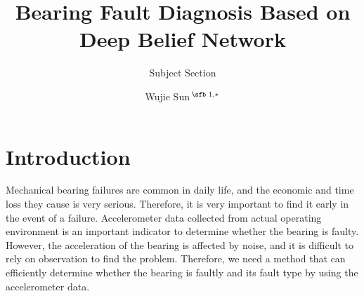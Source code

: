 \documentclass{modified}
\begin{document}

\subtitle{Subject Section}

\title[Bearing Fault Diagnosis Based on Deep Belief Network]{Bearing Fault Diagnosis Based on Deep Belief Network}
\author[Sun.]{Wujie Sun\,$^{\text{\sfb 1,}*}$}
\address{$^{\text{\sf 1}}$School of Software Engineering, South China University of Technology, Guangzhou 510006, P.R. China.}





\maketitle

\section{Introduction}
Mechanical bearing failures are common in daily life, and the economic and time loss they cause is very serious. Therefore, it is very important to find it early in the event of a failure. Accelerometer data collected from actual operating environment is an important indicator to determine whether the bearing is faulty. However, the acceleration of the bearing is affected by noise, and it is difficult to rely on observation to find the problem. Therefore, we need a method that can efficiently determine whether the bearing is faultly and its fault type by using the accelerometer data. 
\end{document}
